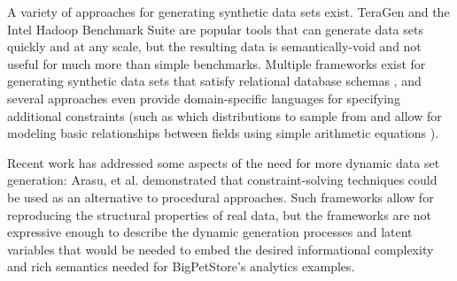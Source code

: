 \documentclass[conference]{IEEEtran}
\begin{document}


A variety of approaches for generating synthetic data sets exist.  TeraGen and the Intel Hadoop Benchmark Suite \cite{Huang2010} are popular tools that can generate data sets quickly and at any scale, but the resulting data is semantically-void and not useful for much more than simple benchmarks.  Multiple frameworks exist for generating synthetic data sets that satisfy relational database schemas \cite{Ghazal2013,Rabl2011a,Frank2012,Rabl2011,Gray1994,Bruno2005,Hoag2007}, and several approaches even provide domain-specific languages \cite{LogSynth,Bruno2005,Hoag2007} for specifying additional constraints (such as which distributions to sample from and allow for modeling basic relationships between fields using simple arithmetic equations \cite{Alexandrov2012}).

Recent work has addressed some aspects of the need for more dynamic data set generation: Arasu, et al. \cite{Arasu2011} demonstrated that constraint-solving techniques could be used as an alternative to procedural approaches. Such frameworks allow for reproducing the structural properties of real data, but the frameworks are not expressive enough to describe the dynamic generation processes and latent variables that would be needed to embed the desired informational complexity and rich semantics needed for BigPetStore's analytics examples.
\end{document}
